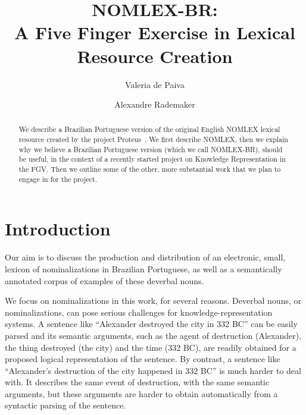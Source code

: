 \documentclass{article}
\begin{document}
\title{NOMLEX-BR: \\ A Five Finger Exercise in Lexical Resource Creation}
\author{Valeria de Paiva \and Alexandre Rademaker}
\maketitle

\begin{abstract} 
  We describe a Brazilian Portuguese version of the original English
  NOMLEX lexical resource created by the project
  Proteus~\cite{nomlex98}. We first describe NOMLEX, then we explain
  why we believe a Brazilian Portuguese version (which we call
  NOMLEX-BR), should be useful, in the context of a recently started
  project on Knowledge Representation in the FGV. Then we outline some
  of the other, more substantial work that we plan to engage in for
  the project.
\end{abstract}


\section{Introduction}


Our aim is to discuss the production and distribution of an
electronic, small, lexicon of nominalizations in Brazilian Portuguese,
as well as a semantically annotated corpus of examples of these
deverbal nouns.

We focus on nominalizations in this work, for several reasons.
Deverbal nouns, or nominalizations, can pose serious challenges for
knowledge-representation systems. A sentence like ``Alexander
destroyed the city in 332 BC'' can be easily parsed and its semantic
arguments, such as the agent of destruction (Alexander), the thing
destroyed (the city) and the time (332 BC), are readily obtained for a
proposed logical representation of the sentence. By contrast, a
sentence like ``Alexander's destruction of the city happened in 332
BC'' is much harder to deal with. It describes the same event of
destruction, with the same semantic arguments, but these arguments are
harder to obtain automatically from a syntactic parsing of the
sentence.
\end{document}
